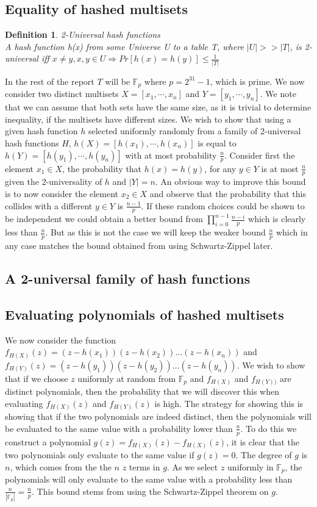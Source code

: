 \documentclass[article,a4paper,oneside]{article}
\newtheorem{definition}{Definition}
\newcommand{\+}[1]{\ensuremath{\boldsymbol{#1}}}
\begin{document}
\subsection*{Equality of hashed multisets}
\begin{definition}{2-Universal hash functions}\\
A hash function h(x) from some Universe \emph{U} to a table {T}, where $|U| >> |T|$, is 2\emph{-}universal iff $x \neq y, x,y \in U \Rightarrow Pr[h(x) = h(y)] \leq \frac{1}{|T|}$
\end{definition}
In the rest of the report $T$ will be $\mathbb{F}_p$ where $p = 2^{31} - 1$, which is prime.
We now consider two distinct multisets $X = \left[x_1,\cdots, x_n\right]$ and $Y = \left[y_1, \cdots, y_n\right]$. We note that we can assume that both sets have the same size, as it is trivial to determine inequality, if the multisets have different sizes.
We wish to show that using a given hash function $h$ selected uniformly randomly from a family of 2-universal hash functions $H$, $h(X) = \left[h(x_1),\cdots, h(x_n)\right]$ is equal to $h(Y) = \left[h(y_1),\cdots,h(y_n)\right]$ with at most probability $\frac{n}{p}$.
Consider first the element $x_1 \in X$, the probability that $h(x) = h(y)$, for any $y \in Y$ is at most $\frac{n}{p}$ given the 2-universality of $h$ and $|Y| = n$.
An obvious way to improve this bound is to now consider the element $x_2 \in X$ and observe that the probability that this collides with a different $y \in Y$ is $\frac{n-1}{p}$. If these random choices could be shown to be independent we could obtain a better bound from $\prod_{i=0}^{n-1}\frac{n-i}{p}$ which is clearly less than $\frac{n}{p}$. But as this is not the case we will keep the weaker bound $\frac{n}{p}$ which in any case matches the bound obtained from using Schwartz-Zippel later.
\subsection*{A 2-universal family of hash functions}
\subsection*{Evaluating polynomials of hashed multisets}
We now consider the function $f_{H(X)}(z) = (z-h(x_1))(z-h(x_2))\ldots(z - h(x_n))$ and $f_{H(Y)}(z) = (z-h(y_1))(z-h(y_2))\ldots(z - h(y_n))$.
We wish to show that if we choose $z$ uniformly at random from $\mathbb{F}_p$ and $f_{H(X)}$ and $f_{H(Y))}$ are distinct polynomials, then the probability that we will discover this when evaluating $f_{H(X)}(z)$ and $f_{H(Y)}(z)$ is high. The strategy for showing this is showing that if the two polynomials are indeed distinct, then the polynomials will be evaluated to the same value with a probability lower than $\frac{n}{p}$.
To do this we construct a polynomial $g(z) = f_{H(X)}(z) - f_{H(X)}(z)$, it is clear that the two polynomials only evaluate to the same value if $g(z) = 0$. The degree of $g$ is $n$, which comes from the the $n$ $z$ terms in $g$.
As we select $z$ uniformly in $\mathbb{F}_p$, the polynomials will only evaluate to the same value with a probability less than $\frac{n}{|\mathbb{F}_p|} = \frac{n}{p}$. This bound stems from using the Schwartz-Zippel theorem on $g$.
\end{document}
